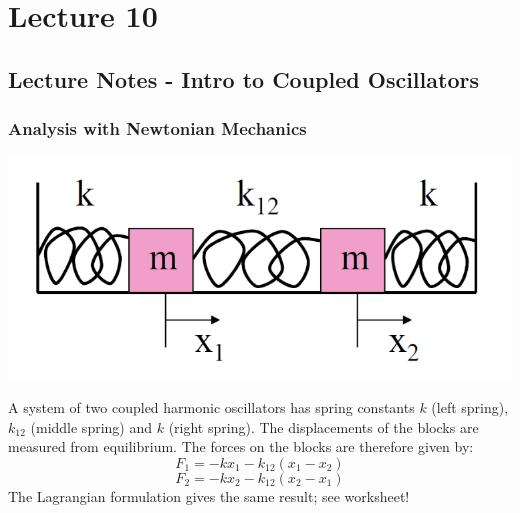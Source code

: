 \section{Lecture 10}
\subsection{Lecture Notes - Intro to Coupled Oscillators}
\subsubsection{Analysis with Newtonian Mechanics}
\begin{center}
    \includegraphics[scale=0.5]{Lecture-10/w10-img1.png}
\end{center}
A system of two coupled harmonic oscillators has spring constants $k$ (left spring), $k_{12}$ (middle spring) and $k$ (right spring). The displacements of the blocks are measured from equilibrium. The forces on the blocks are therefore given by:
\[F_1 = -kx_1 - k_{12}(x_1 - x_2)\]
\[F_2 = -kx_2 - k_{12}(x_2 - x_1)\]
The Lagrangian formulation gives the same result; see worksheet!